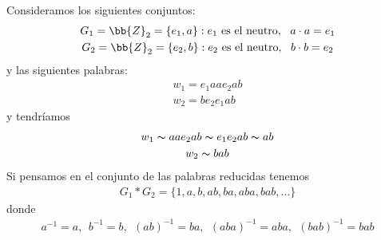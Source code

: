 \begin{ejemplo}
    Consideramos los siguientes conjuntos:
    \begin{gather*}
        G_1 = \bb{Z}_2 = \{e_1, a\}: e_1 \text{ es el neutro},\ \ a\cdot a = e_1\\
        G_2 = \bb{Z}_2 = \{e_2, b\}: e_2 \text{ es el neutro},\ \ b\cdot b = e_2
    \end{gather*}
    y las siguientes palabras:
    \begin{gather*}
        w_1 = e_1aae_2ab\\
        w_2=be_2e_1ab
    \end{gather*}
    y tendríamos 
    \begin{gather*}
        w_1 \thicksim aae_2ab \thicksim e_1e_2ab \thicksim ab\\
        w_2 \thicksim bab
    \end{gather*}
    Si pensamos en el conjunto de las palabras reducidas tenemos 
    \begin{gather*}
        G_1 \ast G_2 = \{1, a, b, ab, ba, aba, bab, ...\}
    \end{gather*}
    donde 
    \begin{gather*}
        a^{-1} = a,\ \ b^{-1}=b,\ \ (ab)^{-1}=ba,\ \ (aba)^{-1}=aba,\ \ (bab)^{-1} = bab
    \end{gather*}
\end{ejemplo}


